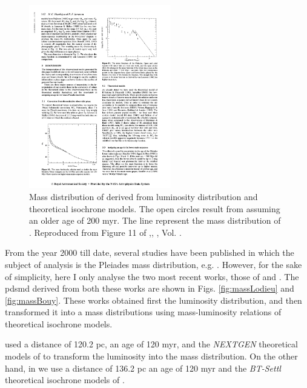 \begin{figure}[ht!]
\begin{center}
\includegraphics[height=8cm]{background/Figures/F11_Hambly1991.pdf}
\caption{Mass distribution of \citet{Hambly1991} derived from luminosity distribution and theoretical isochrone models. The open circles result from assuming an older age of 200 \gls{myr}. The line represent the mass distribution of \citet{1980IAUS...85..157V}. Reproduced from Figure 11 of \citet{Hambly1991},\textit{}, , Vol. .}
\label{fig:massHambly}
\end{center}
\end{figure}

From the year 2000 till date, several studies have been published in which the subject of analysis is the Pleiades mass distribution, e.g. \citet{2000ASPC..198...59H, 2002MNRAS.335..853J, 2001A&A...367..211M,2003A&A...400..891M, 2004A&A...426...75M, 2007MNRAS.380..712L}. However, for the sake of simplicity, here I only analyse the two most recent works, those of \citet{Lodieu2012} and \citet{Bouy2015}. The \gls{pdsmd} derived from both these works are shown in Figs. \ref{fig:massLodieu} and \ref{fig:massBouy}. These works obtained first the luminosity distribution, and then transformed it into a mass distributions using mass-luminosity relations of theoretical isochrone models. 

\citet{Lodieu2012} used a distance of 120.2 pc, an age of 120 \gls{myr}, and the \emph{NEXTGEN} theoretical models of \citet{1998A&A...337..403B} to transform the luminosity into the mass distribution. On the other hand, in \citet{Bouy2015} we use a distance of 136.2 pc an age of 120 \gls{myr} and the \emph{BT-Settl} theoretical isochrone models of \citet{2014IAUS..299..271A}. 

